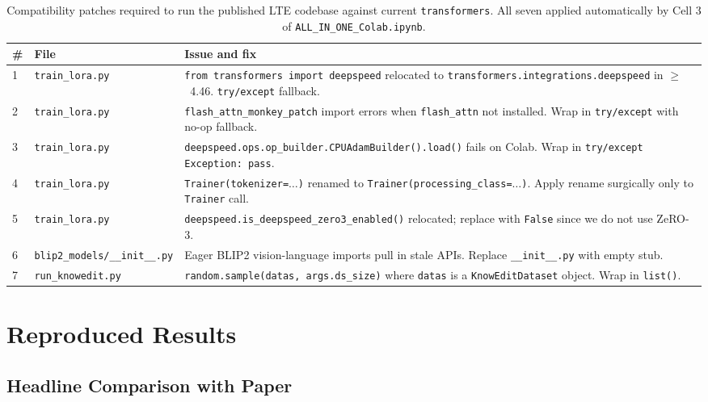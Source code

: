 \documentclass[11pt,a4paper,twocolumn]{article}
\begin{document}
\begin{table}[t]
\centering
\small
\caption{Compatibility patches required to run the published LTE codebase against current \texttt{transformers}. All seven applied automatically by Cell 3 of \texttt{ALL\_IN\_ONE\_Colab.ipynb}.}
\label{tab:patches}
\begin{tabular}{p{}p{}p{}}
\toprule
\textbf{\#} & \textbf{File} & \textbf{Issue and fix} \\
\midrule
1 & \texttt{train\_lora.py} & \texttt{from transformers import deepspeed} relocated to \texttt{transformers.integrations.deepspeed} in $\geq$~4.46. \texttt{try/except} fallback. \\
2 & \texttt{train\_lora.py} & \texttt{flash\_attn\_monkey\_patch} import errors when \texttt{flash\_attn} not installed. Wrap in \texttt{try/except} with no-op fallback. \\
3 & \texttt{train\_lora.py} & \texttt{deepspeed.ops.op\_builder.CPUAdamBuilder().load()} fails on Colab. Wrap in \texttt{try/except Exception: pass}. \\
4 & \texttt{train\_lora.py} & \texttt{Trainer(tokenizer=}$\ldots$\texttt{)} renamed to \texttt{Trainer(processing\_class=}$\ldots$\texttt{)}. Apply rename surgically only to \texttt{Trainer} call. \\
5 & \texttt{train\_lora.py} & \texttt{deepspeed.is\_deepspeed\_zero3\_enabled()} relocated; replace with \texttt{False} since we do not use ZeRO-3. \\
6 & \texttt{blip2\_models/\_\_init\_\_.py} & Eager BLIP2 vision-language imports pull in stale APIs. Replace \texttt{\_\_init\_\_.py} with empty stub. \\
7 & \texttt{run\_knowedit.py} & \texttt{random.sample(datas, args.ds\_size)} where \texttt{datas} is a \texttt{KnowEditDataset} object. Wrap in \texttt{list()}. \\
\bottomrule
\end{tabular}
\end{table}

\section{Reproduced Results}
\label{sec:results}

\subsection{Headline Comparison with Paper}
\end{document}

